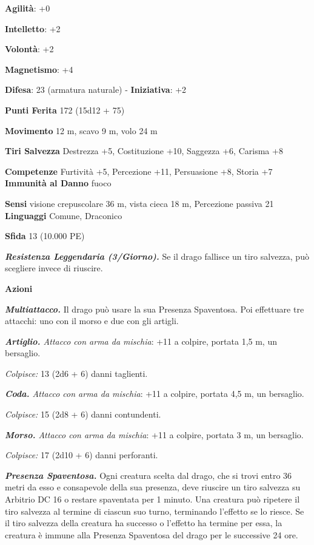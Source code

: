 \begin{multicols}{2}
\textbf{Agilità}: +0

\textbf{Intelletto}: +2

\textbf{Volontà}: +2

\textbf{Magnetismo}: +4

\textbf{Difesa}: 23 (armatura naturale) - \textbf{Iniziativa}: +2

\textbf{Punti Ferita} 172 (15d12 + 75)

\textbf{Movimento} 12 m, scavo 9 m, volo 24 m

\textbf{Tiri Salvezza} Destrezza +5, Costituzione +10, Saggezza +6,
Carisma +8

\textbf{Competenze} Furtività +5, Percezione +11, Persuasione +8, Storia +7
\textbf{Immunità al Danno} fuoco

\textbf{Sensi} visione crepuscolare 36 m, vista cieca 18 m, Percezione passiva
21 \textbf{Linguaggi} Comune, Draconico

\textbf{Sfida} 13 (10.000 PE)

\emph{\textbf{Resistenza Leggendaria (3/Giorno).}} Se il drago fallisce
un tiro salvezza, può scegliere invece di riuscire.

\textbf{Azioni}

\emph{\textbf{Multiattacco.}} Il drago può usare la sua Presenza
Spaventosa. Poi effettuare tre attacchi: uno con il morso e due con gli
artigli.

\emph{\textbf{Artiglio.} Attacco con arma da mischia}: +11 a colpire,
portata 1,5 m, un bersaglio.

\emph{Colpisce:} 13 (2d6 + 6) danni taglienti.

\emph{\textbf{Coda.} Attacco con arma da mischia}: +11 a colpire,
portata 4,5 m, un bersaglio.

\emph{Colpisce:} 15 (2d8 + 6) danni contundenti.

\emph{\textbf{Morso.} Attacco con arma da mischia}: +11 a colpire,
portata 3 m, un bersaglio.

\emph{Colpisce:} 17 (2d10 + 6) danni perforanti.

\emph{\textbf{Presenza Spaventosa.}} Ogni creatura scelta dal drago, che
si trovi entro 36 metri da esso e consapevole della sua presenza, deve
riuscire un tiro salvezza su Arbitrio DC 16 o restare spaventata per 1
minuto. Una creatura può ripetere il tiro salvezza al termine di ciascun
suo turno, terminando l'effetto se lo riesce. Se il tiro salvezza della
creatura ha successo o l'effetto ha termine per essa, la creatura è
immune alla Presenza Spaventosa del drago per le successive 24 ore.


\end{multicols}
